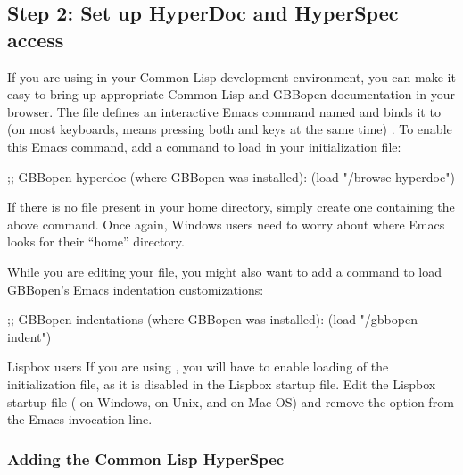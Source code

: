 \documentclass[10pt,twoside,english,pdftex]{article}
\begin{document}
\subsection*{Step 2: Set up  HyperDoc and HyperSpec access}

%
If you are using
 in your Common
Lisp development environment, you can make it easy to bring up appropriate
Common Lisp and GBBopen documentation in your browser.  The file
 defines an interactive
Emacs command named  and binds it to
 (on most keyboards,  means pressing
both  and  keys at the same time) .  To enable this Emacs
command, add a command to load
 in your 
initialization file:
%
\W\supp
\begin{example}
  ;; GBBopen hyperdoc (where GBBopen was installed):
  (load "/browse-hyperdoc")
\end{example}

If there is no  file present in your home directory, simply
create one containing the above command. Once again, Windows users need to
worry about where Emacs looks for their ``home'' directory.

While you are editing your  file, you might also want to add a
command to load GBBopen's Emacs indentation customizations:
%
\W\supp
\begin{example}
  ;; GBBopen indentations (where GBBopen was installed):
  (load "/gbbopen-indent")
\end{example}

\begin{notebox}{Lispbox users}
If you are using
, you
will have to enable loading of the  initialization file, as it is
disabled in the Lispbox startup file.  Edit the Lispbox startup file
( on Windows,  on Unix, and
 on Mac
OS) and remove the  option from the Emacs
invocation line.
\end{notebox}

\subsubsection*{Adding the Common Lisp HyperSpec}
\end{document}

